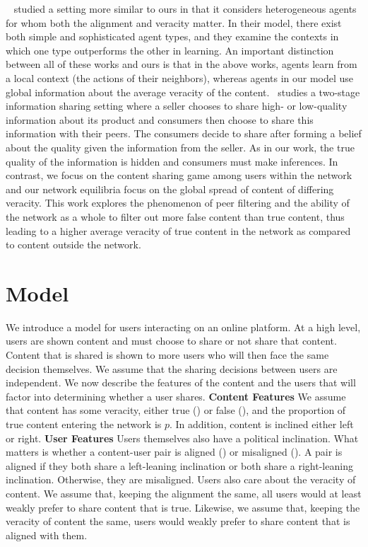 ~\cite{mostagir2022learning} studied a setting more similar to ours in that it considers heterogeneous agents for whom both the alignment and veracity matter. In their model, there exist both simple and sophisticated agent types, and they examine the contexts in which one type outperforms the other in learning. An important distinction between all of these works and ours is that in the above works, agents learn from a local context (the actions of their neighbors), whereas agents in our model use global information about the average veracity of the content.~\cite{kranton2024social} studies a two-stage information sharing setting where a seller chooses to share high- or low-quality information about its product and consumers then choose to share this information with their peers. The consumers decide to share after forming a belief about the quality given the information from the seller. As in our work, the true quality of the information is hidden and consumers must make inferences. In contrast, we focus on the content sharing game among users within the network and our network equilibria focus on the global spread of content of differing veracity. This work explores the phenomenon of peer filtering and the ability of the network as a whole to filter out more false content than true content, thus leading to a higher average veracity of true content in the network as compared to content outside the network.

\section{Model}
We introduce a model for users interacting on an online platform. At a high level, users are shown content and must choose to share or not share that content. Content that is shared is shown to more users who will then face the same decision themselves. We assume that the sharing decisions between users are independent. We now describe the features of the content and the users that will factor into determining whether a user shares. 
\textbf{Content Features} We assume that content has some veracity, either true (\true) or false (\false), and the proportion of true content entering the network is $p$. In addition, content is inclined either left or right. 
\textbf{User Features} Users themselves also have a political inclination. What matters is whether a content-user pair is aligned (\alg) or misaligned (\mal). A pair is aligned if they both share a left-leaning inclination or both share a right-leaning inclination. Otherwise, they are misaligned. Users also care about the veracity of content. We assume that, keeping the alignment the same, all users would at least weakly prefer to share content that is true. Likewise, we assume that, keeping the veracity of content the same, users would weakly prefer to share content that is aligned with them. 

